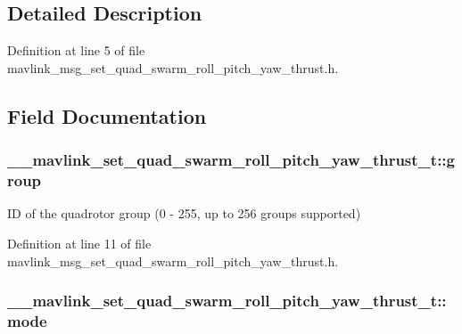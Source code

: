 \subsection{Detailed Description}


Definition at line 5 of file mavlink\-\_\-msg\-\_\-set\-\_\-quad\-\_\-swarm\-\_\-roll\-\_\-pitch\-\_\-yaw\-\_\-thrust.\-h.



\subsection{Field Documentation}
\hypertarget{struct____mavlink__set__quad__swarm__roll__pitch__yaw__thrust__t_ac837a11de67fbc795765422af3441bfc}{
\subsubsection[{group}]{ \-\_\-\-\_\-mavlink\-\_\-set\-\_\-quad\-\_\-swarm\-\_\-roll\-\_\-pitch\-\_\-yaw\-\_\-thrust\-\_\-t\-::group}}\label{struct____mavlink__set__quad__swarm__roll__pitch__yaw__thrust__t_ac837a11de67fbc795765422af3441bfc}


I\-D of the quadrotor group (0 -\/ 255, up to 256 groups supported) 



Definition at line 11 of file mavlink\-\_\-msg\-\_\-set\-\_\-quad\-\_\-swarm\-\_\-roll\-\_\-pitch\-\_\-yaw\-\_\-thrust.\-h.

\hypertarget{struct____mavlink__set__quad__swarm__roll__pitch__yaw__thrust__t_ad5c5e1e904f27689534fb1075c2b8591}{
\subsubsection[{mode}]{ \-\_\-\-\_\-mavlink\-\_\-set\-\_\-quad\-\_\-swarm\-\_\-roll\-\_\-pitch\-\_\-yaw\-\_\-thrust\-\_\-t\-::mode}}\label{struct____mavlink__set__quad__swarm__roll__pitch__yaw__thrust__t_ad5c5e1e904f27689534fb1075c2b8591}


